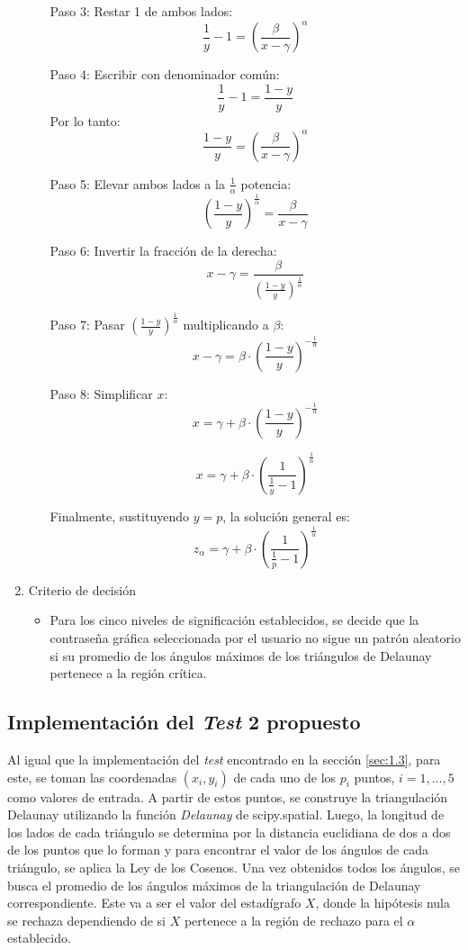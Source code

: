 \documentclass[12pt]{report}
\begin{document}
\begin{enumerate}
\begin{itemize}
		Paso 3: Restar 1 de ambos lados:
		\[
		\frac{1}{y} - 1 = \left( \frac{\beta}{x - \gamma} \right)^\alpha
		\]
		
		Paso 4: Escribir con denominador común:
		\[
		\frac{1}{y} - 1 = \frac{1 - y}{y}
		\]
		Por lo tanto:
		\[
		\frac{1 - y}{y} = \left( \frac{\beta}{x - \gamma} \right)^\alpha
		\]
		
		Paso 5: Elevar ambos lados a la \( \frac{1}{\alpha} \) potencia:
		\[
		\left( \frac{1 - y}{y} \right)^{\frac{1}{\alpha}} = \frac{\beta}{x - \gamma}
		\]
		
		Paso 6: Invertir la fracción de la derecha:
		\[
		x - \gamma = \frac{\beta}{\left( \frac{1 - y}{y} \right)^{\frac{1}{\alpha}}}
		\]
				
		Paso 7: Pasar \( \left( \frac{1 - y}{y} \right)^{\frac{1}{\alpha}} \) multiplicando a \( \beta \):
		\[
		x - \gamma = \beta \cdot \left( \frac{1 - y}{y} \right)^{-\frac{1}{\alpha}}
		\]
		
		Paso 8: Simplificar \( x \):
		\[
		x = \gamma + \beta \cdot \left( \frac{1 - y}{y} \right)^{-\frac{1}{\alpha}}
		\]
		
		\[
		x = \gamma + \beta \cdot \left( \frac{1}{\frac{1}{y}-1} \right)^{\frac{1}{\alpha}}
		\]
		
		Finalmente, sustituyendo \( y = p \), la solución general es:
		\[
		 z_\alpha = \gamma + \beta \cdot \left( \frac{1}{\frac{1}{p}-1} \right)^{\frac{1}{\alpha}}
		\]
		
		
	\end{itemize}
	\item Criterio de decisión
	\begin{itemize}
		\item Para los cinco niveles de significación establecidos, se decide que la contraseña gráfica seleccionada por el usuario no sigue un patrón aleatorio si su promedio de los ángulos máximos de los triángulos de Delaunay  pertenece a la región crítica. 
	\end{itemize}
\end{enumerate}
\subsection{Implementación del \textit{Test} 2 propuesto }
\label{sec:2.3}

Al igual que  la implementación del \textit{test} encontrado en la sección \ref{sec:1.3}, para este, se toman las coordenadas \((x_i, y_i)\) de cada uno de los \(p_i\) puntos, \(i = 1, \ldots, 5\) como valores de entrada. A partir de estos puntos, se construye la triangulación Delaunay utilizando la función \textit{Delaunay} de scipy.spatial.
Luego, la longitud de los lados de cada triángulo se determina por la distancia euclidiana de dos a dos de los puntos que lo forman y para encontrar el valor de los ángulos de cada triángulo, se aplica la Ley de los Cosenos. Una vez obtenidos todos los ángulos, se busca el promedio de los ángulos máximos  de la triangulación de Delaunay correspondiente.  Este va a ser el valor del estadígrafo \(X\), donde la hipótesis nula se rechaza dependiendo de si  \(X\) pertenece a la región de rechazo para el \(\alpha\) establecido. 
\end{document}
